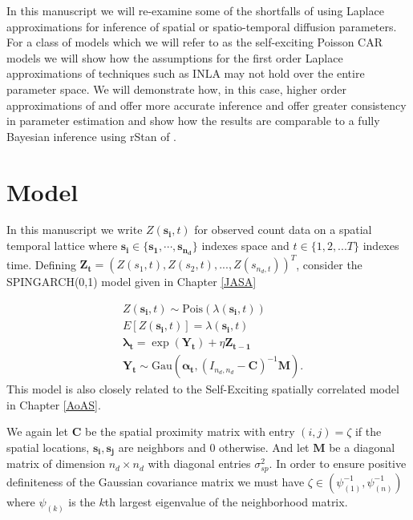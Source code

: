 \documentclass[11pt]{isuthesis}
\begin{document}
	In this manuscript we will re-examine some of the shortfalls of using Laplace approximations for inference of spatial or spatio-temporal diffusion parameters.  For a class of models which we will refer to as the self-exciting Poisson CAR models we will show how the assumptions for the first order Laplace approximations of techniques such as INLA may not hold over the entire parameter space.  We will demonstrate how, in this case, higher order approximations of \cite{shun1995laplace} and \cite{evangelou2011estimation} offer more accurate inference and offer greater consistency in parameter estimation and show how the results are comparable to a fully Bayesian inference using rStan of \cite{gelman2015stan}.
	
	
	\section{Model}
	
	
	
	
	
	In this manuscript we write $Z(\boldsymbol{s_i},t)$ for observed count data on a spatial temporal lattice where $\boldsymbol{s_i} \in \{\boldsymbol{s_1},\cdots,\boldsymbol{s_{n_d}}\}$ indexes space and $t\in\{1,2,...T\}$ indexes time.  Defining $\boldsymbol{Z_t} = (Z(s_1,t),Z(s_2,t),...,Z(s_{n_d,t}))^T$, consider the SPINGARCH(0,1) model given in Chapter \ref{JASA}
	
	\begin{align}
	& Z(\boldsymbol{s_i},t) \sim \mbox{Pois}(\lambda(\boldsymbol{s_i},t)) \label{eq:timeseries} \\
	& E[Z(\boldsymbol{s_i},t)]=\lambda(\boldsymbol{s_i},t)\\
	& \boldsymbol{\lambda_t} = \exp(\boldsymbol{Y_t})+\eta \boldsymbol{Z_{t-1}}\\
	& \boldsymbol{Y_t} \sim \mbox{Gau}\textit{} (\boldsymbol{\alpha_t},(I_{{n_d},{n_d}}-\boldsymbol{C})^{-1}\boldsymbol{M}).
	\end{align}
	This model is also closely related to the Self-Exciting spatially correlated model in Chapter \ref{AoAS}.
	
	We again let $\boldsymbol{C}$ be the spatial proximity matrix with entry $(i,j)=\zeta$ if the spatial locations, $\boldsymbol{s_i},\boldsymbol{s_j}$ are neighbors and $0$ otherwise.  And let $\boldsymbol{M}$ be a diagonal matrix of dimension $n_d \times n_d$ with diagonal entries $\sigma_{sp}^2$.  In order to ensure positive definiteness of the Gaussian covariance matrix we must have $\zeta \in (\psi_{(1)}^{-1},\psi_{(n)}^{-1})$ where $\psi_{(k)}$ is the $k$th largest eigenvalue of the neighborhood matrix.   
	
\end{document}
